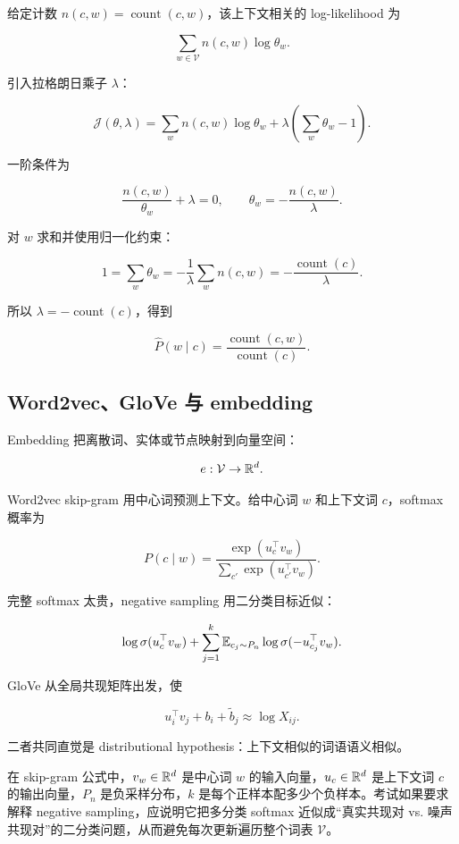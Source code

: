 \documentclass[11pt]{ctexart}
\begin{document}
给定计数 \(n(c,w)=\operatorname{count}(c,w)\)，该上下文相关的 log-likelihood 为

\[
  \sum_{w\in\mathcal{V}}
  n(c,w)\log\theta_w.
\]

引入拉格朗日乘子 \(\lambda\)：

\[
  \mathcal{J}(\theta,\lambda)
  =
  \sum_w n(c,w)\log\theta_w
  +
  \lambda\left(\sum_w\theta_w-1\right).
\]

一阶条件为

\[
  \frac{n(c,w)}{\theta_w}+\lambda=0,
  \qquad
  \theta_w=-\frac{n(c,w)}{\lambda}.
\]

对 \(w\) 求和并使用归一化约束：

\[
  1=\sum_w\theta_w
  =
  -\frac{1}{\lambda}
  \sum_w n(c,w)
  =
  -\frac{\operatorname{count}(c)}{\lambda}.
\]

所以 \(\lambda=-\operatorname{count}(c)\)，得到

\[
  \widehat P(w\mid c)
  =
  \frac{\operatorname{count}(c,w)}{\operatorname{count}(c)}.
\]

\subsection{Word2vec、GloVe 与 embedding}


Embedding 把离散词、实体或节点映射到向量空间：

\[
  e:\mathcal{V}\to\mathbb{R}^d.
\]

Word2vec skip-gram 用中心词预测上下文。给中心词 \(w\) 和上下文词 \(c\)，softmax 概率为

\[
  P(c\mid w)
  =
  \frac{\exp(u_c^\top v_w)}
  {\sum_{c'}\exp(u_{c'}^\top v_w)}.
\]

完整 softmax 太贵，negative sampling 用二分类目标近似：

\[
  \log\sigma(u_c^\top v_w)
  +
  \sum_{j=1}^{k}
  \mathbb{E}_{c_j\sim P_n}
  \log\sigma(-u_{c_j}^\top v_w).
\]

GloVe 从全局共现矩阵出发，使

\[
  u_i^\top v_j+b_i+\tilde b_j
  \approx
  \log X_{ij}.
\]

二者共同直觉是 distributional hypothesis：上下文相似的词语语义相似。

在 skip-gram 公式中，\(v_w\in\mathbb{R}^d\) 是中心词 \(w\) 的输入向量，\(u_c\in\mathbb{R}^d\) 是上下文词 \(c\) 的输出向量，\(P_n\) 是负采样分布，\(k\) 是每个正样本配多少个负样本。考试如果要求解释 negative sampling，应说明它把多分类 softmax 近似成“真实共现对 vs. 噪声共现对”的二分类问题，从而避免每次更新遍历整个词表 \(\mathcal{V}\)。
\end{document}
